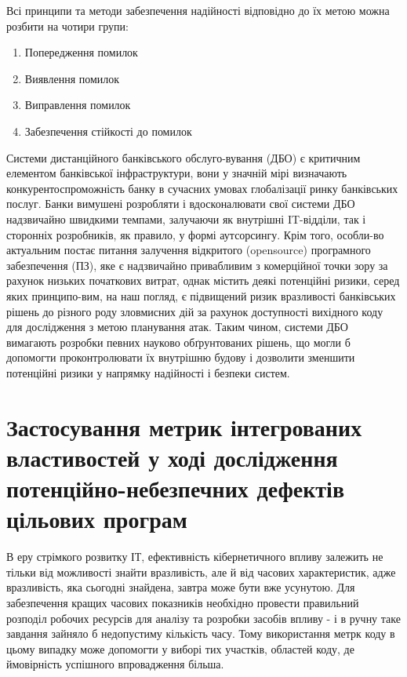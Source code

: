 Всі принципи та методи забезпечення надійності відповідно до їх метою можна розбити на чотири групи:
\begin{enumerate}
\item {} 
Попередження помилок

\item {} 
Виявлення помилок

\item {} 
Виправлення помилок

\item {} 
Забезпечення стійкості до помилок

\end{enumerate}

Системи дистанційного банківського обслуго-вування (ДБО) є критичним елементом банківської інфраструктури, вони у значній мірі визначають конкурентоспроможність банку в сучасних умовах глобалізації ринку банківських послуг. Банки вимушені розробляти і вдосконалювати свої системи ДБО надзвичайно швидкими темпами, залучаючи як внутрішні IT-відділи, так і сторонніх розробників, як правило, у формі аутсорсингу. Крім того, особли-во актуальним постає питання залучення відкритого (opensource) програмного забезпечення (ПЗ), яке є надзвичайно привабливим з комерційної точки зору за рахунок низьких початкових витрат, однак містить деякі потенційні ризики, серед яких принципо-вим, на наш погляд, є підвищений ризик вразливості банківських рішень до різного роду зловмисних дій за рахунок доступності вихідного коду для дослідження з метою планування атак. Таким чином, системи ДБО вимагають розробки певних науково обґрунтованих рішень, що могли б допомогти проконтролювати їх внутрішню будову і дозволити зменшити потенційні ризики у напрямку надійності і безпеки систем.


\section{Застосування метрик інтегрованих властивостей у ході дослідження потенційно-небезпечних дефектів цільових програм}
\label{2section:id8}
В еру стрімкого розвитку ІТ, ефективність кібернетичного впливу залежить не тільки від можливості знайти вразливість, але й від часових характеристик, адже вразливість, яка сьогодні знайдена, завтра може бути вже усунутою. Для забезпечення кращих часових показників необхідно провести правильний розподіл робочих ресурсів для аналізу та розробки засобів впливу - і в ручну таке завдання зайняло б недопустиму кількість часу. Тому використання метрк коду в цьому випадку може допомогти у виборі тих участків, областей коду, де ймовірність успішного впровадження більша.

